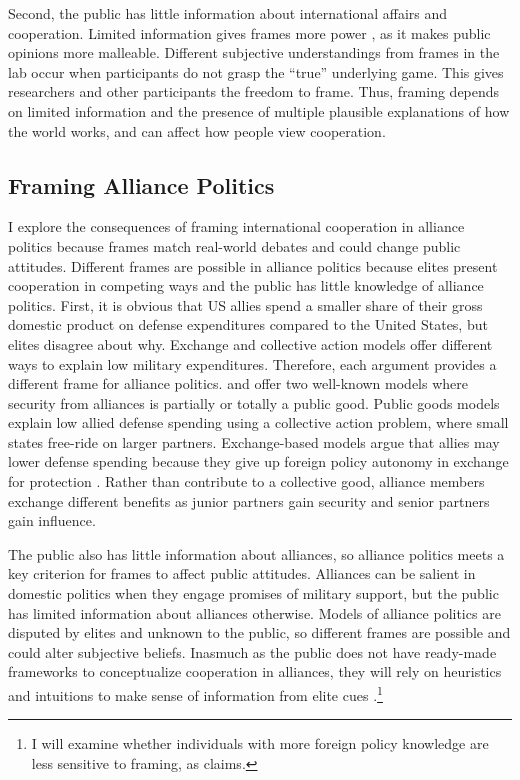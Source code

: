 \documentclass[12pt]{article}
\begin{document}
Second, the public has little information about international affairs and cooperation.
Limited information gives frames more power \citep{Druckman2001}, as it makes public opinions more malleable. 
Different subjective understandings from frames in the lab occur when participants do not grasp the ``true'' underlying game. 
This gives researchers and other participants the freedom to frame.
Thus, framing depends on limited information and the presence of multiple plausible explanations of how the world works, and can affect how people view cooperation.  


\subsection{Framing Alliance Politics}


I explore the consequences of framing international cooperation in alliance politics because frames match real-world debates and could change public attitudes.  
Different frames are possible in alliance politics because elites present cooperation in competing ways and the public has little knowledge of alliance politics. 
First, it is obvious that US allies spend a smaller share of their gross domestic product on defense expenditures compared to the United States, but elites disagree about why. 
Exchange and collective action models offer different ways to explain low military expenditures.
Therefore, each argument provides a different frame for alliance politics. 
\citet{OlsonZeckhauser1966} and \citet{SandlerHartley2001} offer two well-known models where security from alliances is partially or totally a public good.
Public goods models explain low allied defense spending using a collective action problem, where small states free-ride on larger partners. 
Exchange-based models argue that allies may lower defense spending because they give up foreign policy autonomy in exchange for protection \citep{Morrow1991}.
Rather than contribute to a collective good, alliance members exchange different benefits as junior partners gain security and senior partners gain influence. 


The public also has little information about alliances, so alliance politics meets a key criterion for frames to affect public attitudes. 
Alliances can be salient in domestic politics when they engage promises of military support, but the public has limited information about alliances otherwise. 
Models of alliance politics are disputed by elites and unknown to the public, so different frames are possible and could alter subjective beliefs.
Inasmuch as the public does not have ready-made frameworks to conceptualize cooperation in alliances, they will rely on heuristics and intuitions to make sense of information from elite cues \citep{BaumPotter2008}.\footnote{I will examine whether individuals with more foreign policy knowledge are less sensitive to framing, as \citet{Druckman2001} claims.} 
\end{document}
